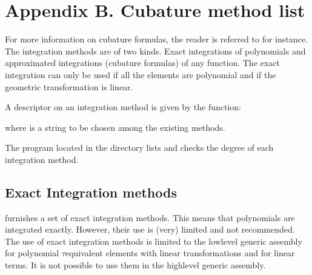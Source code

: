 \documentclass[a4paper,11pt,english]{sphinxmanual}
\begin{document}
\chapter{Appendix B. Cubature method list}
\label{\detokenize{userdoc/appendixB:appendix-b-cubature-method-list}}\label{\detokenize{userdoc/appendixB:ud-appendixb}}\label{\detokenize{userdoc/appendixB::doc}}
For more information on cubature formulas, the reader is referred to  for instance. The integration methods are of two kinds. Exact integrations of polynomials and
approximated integrations (cubature formulas) of any function. The exact
integration can only be used if all the elements are polynomial and if the
geometric transformation is linear.

A descriptor on an integration method is given by the function:

\begin{sphinxVerbatim}[commandchars=\\\{\}]
  
\end{sphinxVerbatim}

where  is a string to be chosen among the existing methods.

The program  located in the  directory lists and checks
the degree of each integration method.


\section{Exact Integration methods}
\label{\detokenize{userdoc/appendixB:exact-integration-methods}}
 furnishes a set of exact integration methods. This means that polynomials are integrated exactly. However, their use is (very) limited and not recommended. The use of exact integration methods is limited to the low\sphinxhyphen{}level generic assembly for polynomial \(\tau\)\sphinxhyphen{}equivalent elements with linear transformations and for linear terms. It is not possible to use them in the high\sphinxhyphen{}level generic assembly.
\end{document}
